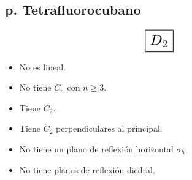 
\subsection*{p. Tetrafluorocubano}

\[ \scalebox{1.7}{$\boxed{D_2}$} \]

\begin{itemize}
    \item No es lineal.
    \item No tiene $C_n$ con $n \geq 3$.
    \item Tiene $C_2$.
    \item Tiene $C_2$ perpendiculares al principal.
    \item No tiene un plano de reflexión horizontal $\sigma_h$.
    \item No tiene planos de reflexión diedral.
\end{itemize}

\iffalse
No es lineal.
No tiene $C_n$ con $n \geq 3$.
Tiene $C_2$.
Tiene $C_2$ perpendiculares al principal.
No tiene un plano de reflexión horizontal $\sigma_h$.
No tiene planos de reflexión diedral.

D_2
\fi